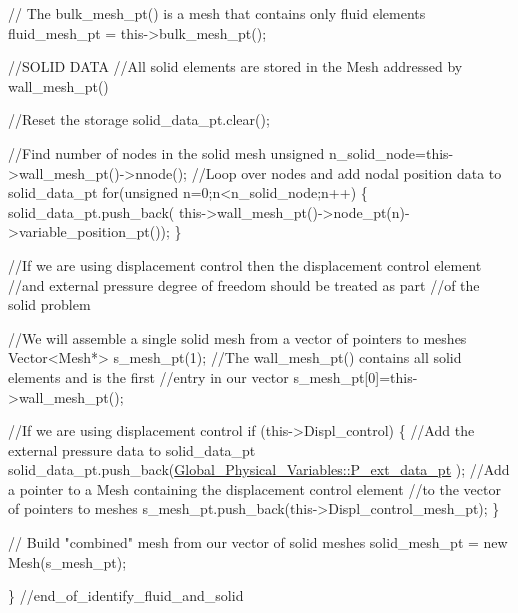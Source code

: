 \begin{DoxyCodeInclude}
 \textcolor{comment}{// The bulk\_mesh\_pt() is a mesh that contains only fluid elements}
 fluid\_mesh\_pt = this->bulk\_mesh\_pt(); 
 

 \textcolor{comment}{//SOLID DATA}
 \textcolor{comment}{//All solid elements are stored in the Mesh addressed by wall\_mesh\_pt()}

 \textcolor{comment}{//Reset the storage}
 solid\_data\_pt.clear();

 \textcolor{comment}{//Find number of nodes in the solid mesh}
 \textcolor{keywordtype}{unsigned} n\_solid\_node=this->wall\_mesh\_pt()->nnode();
 \textcolor{comment}{//Loop over nodes and add nodal position data to solid\_data\_pt}
 \textcolor{keywordflow}{for}(\textcolor{keywordtype}{unsigned} n=0;n<n\_solid\_node;n++)
  \{
   solid\_data\_pt.push\_back(
    this->wall\_mesh\_pt()->node\_pt(n)->variable\_position\_pt());
  \}
   
 \textcolor{comment}{//If we are using displacement control then the displacement control element}
 \textcolor{comment}{//and external pressure degree of freedom should be treated as part}
 \textcolor{comment}{//of the solid problem}

 \textcolor{comment}{//We will assemble a single solid mesh from a vector of pointers to meshes}
 Vector<Mesh*> s\_mesh\_pt(1);
 \textcolor{comment}{//The wall\_mesh\_pt() contains all solid elements and is the first}
 \textcolor{comment}{//entry in our vector}
 s\_mesh\_pt[0]=this->wall\_mesh\_pt();
  
 \textcolor{comment}{//If we are using displacement control}
 \textcolor{keywordflow}{if} (this->Displ\_control)
  \{
   \textcolor{comment}{//Add the external pressure data to solid\_data\_pt}
   solid\_data\_pt.push\_back(\hyperlink{namespaceGlobal__Physical__Variables_ad31ed4ea9a7fce4c20c2230d26047f6f}{Global\_Physical\_Variables::P\_ext\_data\_pt}
      );
   \textcolor{comment}{//Add a pointer to a Mesh containing the displacement control element}
   \textcolor{comment}{//to the vector of pointers to meshes}
   s\_mesh\_pt.push\_back(this->Displ\_control\_mesh\_pt);
  \} 

 \textcolor{comment}{// Build "combined" mesh from our vector of solid meshes}
 solid\_mesh\_pt = \textcolor{keyword}{new} Mesh(s\_mesh\_pt);

\} \textcolor{comment}{//end\_of\_identify\_fluid\_and\_solid}

\end{DoxyCodeInclude}





